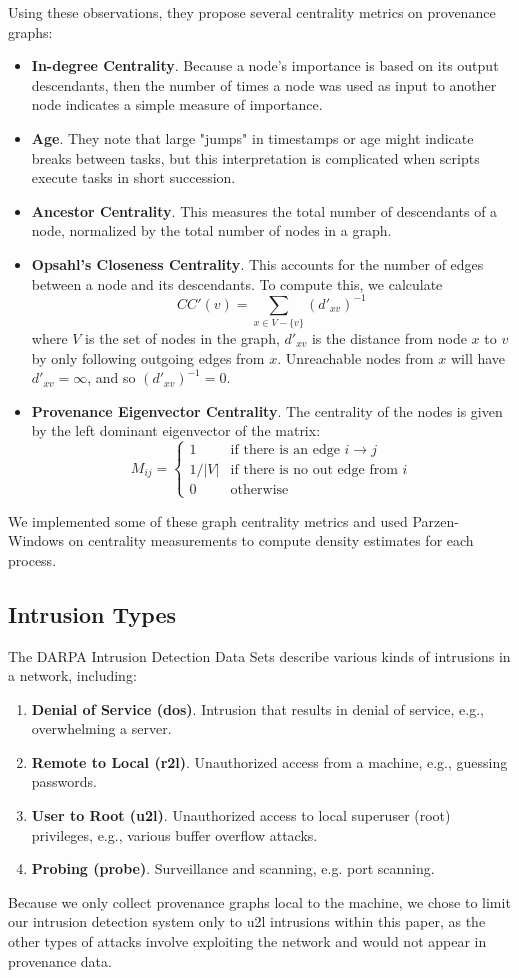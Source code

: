 \documentclass[10pt,twocolumn]{article}
\begin{document}
Using these observations, they propose several centrality metrics on provenance graphs:
\begin{itemize}
\item \textbf{In-degree Centrality}. Because a node's importance is based on its output descendants, then the number of times a node was used as input to another node indicates a simple measure of importance.
\item \textbf{Age}. They note that large "jumps" in timestamps or age might indicate breaks between tasks, but this interpretation is complicated when scripts execute tasks in short succession.
\item \textbf{Ancestor Centrality}. This measures the total number of descendants of a node, normalized by the total number of nodes in a graph.
\item \textbf{Opsahl's Closeness Centrality}. This accounts for the number of edges between a node and its descendants. To compute this, we calculate
$$CC'(v) = \sum_{x \in V -  \{v\}} (d'_{xv})^{-1}$$
where $V$ is the set of nodes in the graph, $d'_{xv}$ is the distance from node $x$ to $v$ by only following outgoing edges from $x$. Unreachable nodes from $x$ will have $d'_{xv} = \infty$, and so $(d'_{xv})^{-1} = 0$.
\item \textbf{Provenance Eigenvector Centrality}. The centrality of the nodes is given by the left dominant eigenvector of the matrix:
$$M_{ij} =
\begin{cases}
1 & \text{if there is an edge } i \to j \\
1/|V| & \text{if there is no out edge from } i \\
0 & \text{otherwise}
\end{cases}
$$
\end{itemize}
We implemented some of these graph centrality metrics and used Parzen-Windows on centrality measurements to compute density estimates for each process.

\subsection{Intrusion Types}

The DARPA Intrusion Detection Data Sets \cite{darpa} describe various kinds of intrusions in a network, including:
\begin{enumerate}
\item {\bf Denial of Service (dos)}. Intrusion that results in denial of service, e.g., overwhelming a server.
\item {\bf Remote to Local (r2l)}. Unauthorized access from a machine, e.g., guessing passwords.
\item {\bf User to Root (u2l)}. Unauthorized access to local superuser (root) privileges, e.g., various buffer overflow attacks.
\item {\bf Probing (probe)}. Surveillance and scanning, e.g. port scanning.
\end{enumerate}
Because we only collect provenance graphs local to the machine, we chose to limit our intrusion detection system only to u2l intrusions within this paper, as the other types of attacks involve exploiting the network and would not appear in provenance data.
\end{document}
